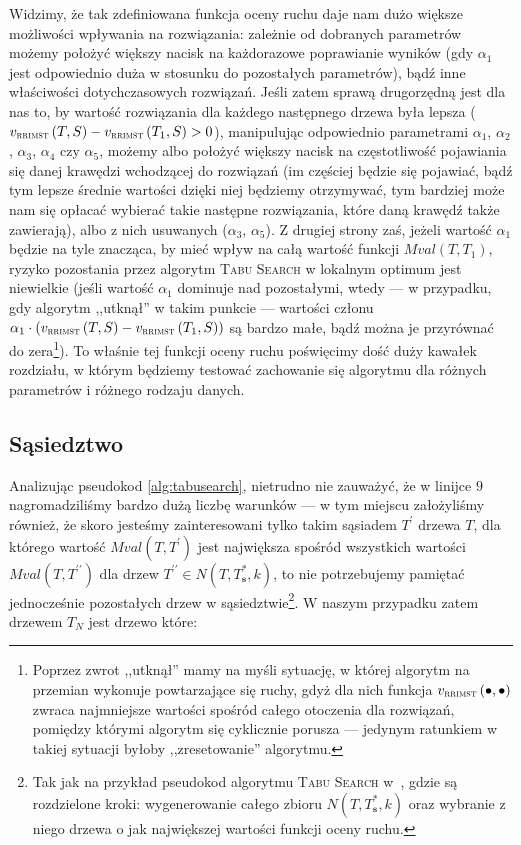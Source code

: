 Widzimy, że tak zdefiniowana funkcja oceny ruchu daje nam dużo większe możliwości wpływania na rozwiązania: zależnie od dobranych parametrów możemy położyć większy nacisk na każdorazowe poprawianie wyników (gdy $\alpha_{1}$ jest odpowiednio duża w stosunku do pozostałych parametrów), bądź inne właściwości dotychczasowych rozwiązań. Jeśli zatem sprawą drugorzędną jest dla nas to, by wartość rozwiązania dla każdego następnego drzewa była lepsza ($v_{\textsc{rrimst}} \left( T, S \right) - v_{\textsc{rrimst}} \left( T_{1}, S \right) > 0$), manipulując odpowiednio parametrami $\alpha_{1}$, $\alpha_{2}$, $\alpha_{3}$, $\alpha_{4}$ czy $\alpha_{5}$, możemy albo położyć większy nacisk na częstotliwość pojawiania się danej krawędzi wchodzącej do rozwiązań (im częściej będzie się pojawiać, bądź tym lepsze średnie wartości dzięki niej będziemy otrzymywać, tym bardziej może nam się opłacać wybierać takie następne rozwiązania, które daną krawędź także zawierają), albo z nich usuwanych ($\alpha_{3}$, $\alpha_{5}$). Z drugiej strony zaś, jeżeli wartość $\alpha_{1}$ będzie na tyle znacząca, by mieć wpływ na całą wartość funkcji $Mval \left( T, T_{1} \right)$, ryzyko pozostania przez algorytm \textsc{Tabu Search} w lokalnym optimum jest niewielkie (jeśli wartość $\alpha_{1}$ dominuje nad pozostałymi, wtedy --- w przypadku, gdy algorytm ,,utknął'' w takim punkcie --- wartości członu $\alpha_{1} \cdot \left( v_{\textsc{rrimst}} \left( T, S \right) - v_{\textsc{rrimst}} \left( T_{1}, S \right) \right)$ są bardzo małe, bądź można je przyrównać do zera\footnote{Poprzez zwrot ,,utknął'' mamy na myśli sytuację, w której algorytm na przemian wykonuje powtarzające się ruchy, gdyż dla nich funkcja $v_{\textsc{rrimst}} \left( \bullet, \bullet \right)$ zwraca najmniejsze wartości spośród całego otoczenia dla rozwiązań, pomiędzy którymi algorytm się cyklicznie porusza --- jedynym ratunkiem w takiej sytuacji byłoby ,,zresetowanie'' algorytmu.}). To właśnie tej funkcji oceny ruchu poświęcimy dość duży kawałek rozdziału, w którym będziemy testować zachowanie się algorytmu dla różnych parametrów i różnego rodzaju danych.

\subsection{Sąsiedztwo}

Analizując pseudokod \ref{alg:tabusearch}, nietrudno nie zauważyć, że w linijce $9$ nagromadziliśmy bardzo dużą liczbę warunków --- w tym miejscu założyliśmy również, że skoro jesteśmy zainteresowani tylko takim sąsiadem $T^{\prime}$ drzewa $T$, dla którego wartość $Mval \left( T, T^{\prime} \right)$ jest największa spośród wszystkich wartości $Mval \left( T, T^{\prime\prime} \right)$ dla drzew $T^{\prime\prime} \in N \left( T, T^{\ast}_{\textbf{s}}, k \right)$, to nie potrzebujemy pamiętać jednocześnie pozostałych drzew w sąsiedztwie\footnote{Tak jak na przykład pseudokod algorytmu \textsc{Tabu Search} w~\cite{Kasperski2012}, gdzie są rozdzielone kroki: wygenerowanie całego zbioru $N \left( T, T^{\ast}_{\textbf{s}}, k \right)$ oraz wybranie z niego drzewa o jak największej wartości funkcji oceny ruchu.}. W naszym przypadku zatem drzewem $T_{N}$ jest drzewo które:

